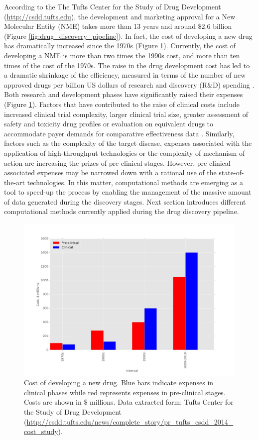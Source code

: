 \documentclass[11pt, b5paper,twoside]{tesi_upf}
\begin{document}
{\par  According to the The Tufts Center for the Study of Drug Development (\url{http://csdd.tufts.edu}), the development and marketing approval for a New Molecular Entity (NME) takes more than 13 years and around  $\$$2.6 billion (Figure \ref{fig:drug_discovery_pipeline}). In fact, the cost of developing a new drug has dramatically increased since the 1970s (Figure \ref{fig:drug_discovery_evolution}). Currently,  the cost of developing a NME is more than two times the 1990s cost, and more than ten times of the cost of the 1970s.   
The raise in the drug development cost has led to a dramatic shrinkage of the efficiency, measured in terms of the number of new approved drugs per billion US dollars of research and discovery (R$\&$D) spending \cite{Scannell2012}. Both research and development phases have significantly raised their expenses (Figure \ref{fig:drug_discovery_evolution}). Factors that have contributed to the raise of clinical costs include increased clinical trial complexity, larger clinical trial size, greater assessment of safety and toxicity drug profiles or evaluation on equivalent drugs to accommodate payer demands for comparative effectiveness data \cite{Scannell2012}. Similarly, factors such as the complexity of the target disease, expenses associated with the application of high-throughput technologies or the complexity of mechanism of action are increasing the prizes of pre-clinical stages. However, pre-clinical associated expenses may be narrowed down with a rational use of the state-of-the-art technologies. In this matter, computational methods are emerging as a tool to speed-up the process by enabling the management of the massive amount of data generated during the discovery stages. Next section introduces different computational methods currently applied during the drug discovery pipeline.  
\begin{figure}[htbp]
\centering
\includegraphics[width=0.9\linewidth]{../figures/drug_discovery_evolution.jpg}
	\caption[Evolution of drug development expenses over time]{Cost of developing a new drug. Blue bars indicate expenses in clinical phases while red represents expenses in pre-clinical stages. Costs are shown in $\$$ millions. Data extracted form: Tufts Center for the Study of Drug Development (\url{http://csdd.tufts.edu/news/complete_story/pr_tufts_csdd_2014_cost_study}).}
\label{fig:drug_discovery_evolution}
	

\end{figure}}
\end{document}
